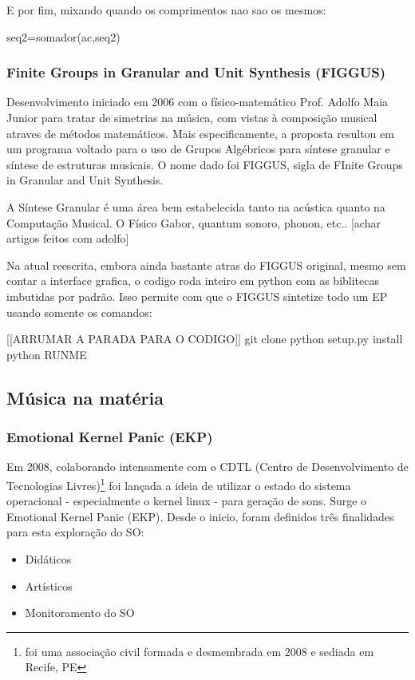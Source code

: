 E por fim, mixando quando os comprimentos nao sao os mesmos:

seq2=somador(ac,seq2)




\subsubsection{Finite Groups in Granular and Unit Synthesis (FIGGUS)}

Desenvolvimento iniciado em 2006 com o físico-matemático Prof. Adolfo Maia Junior para
tratar de simetrias na música, com vistas à composição musical atraves
de métodos matemáticos. Mais especificamente, a proposta resultou em
um programa voltado para o uso de Grupos Algébricos para síntese
granular e síntese de estruturas musicais. O nome dado
foi FIGGUS, sigla de FInite Groups in Granular and Unit Synthesis.

A Síntese Granular é uma área bem estabelecida tanto na acústica quanto
na Computação Musical. O Físico Gabor, quantum sonoro, phonon, etc..
[achar artigos feitos com adolfo]

Na atual reescrita, embora ainda bastante atras do FIGGUS original,
mesmo sem contar a interface grafica, o codigo roda inteiro em python
com as biblitecas imbutidas por padrão. Isso permite com que o FIGGUS
sintetize todo um EP usando somente os comandos:

[[ARRUMAR A PARADA PARA O CODIGO]]
git clone
python setup.py install
python RUNME




  \subsection{Música na matéria}
      \subsubsection{Emotional Kernel Panic (EKP)}

Em 2008, colaborando intensamente com o CDTL
(Centro de Desenvolvimento de Tecnologias Livres)\footnote{foi uma associação civil formada e desmembrada em 2008 e sediada em Recife, PE}
foi lançada a ideia de utilizar o estado do sistema operacional - especialmente o kernel linux - para
geração de sons. Surge o Emotional Kernel Panic (EKP). Desde o inicio, foram definidos três finalidades
para esta exploração do SO:

\begin{itemize}
    \item Didáticos
    \item Artísticos
    \item Monitoramento do SO
\end{itemize}

